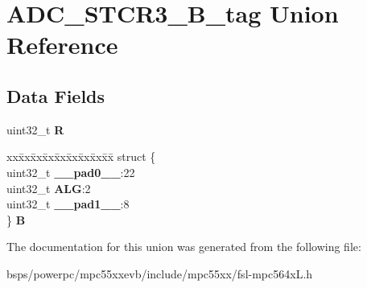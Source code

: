 \hypertarget{unionADC__STCR3__32B__tag}{}\section{A\+D\+C\+\_\+\+S\+T\+C\+R3\+\_\+B\+\_\+tag Union Reference}
\label{unionADC__STCR3__32B__tag}
\subsection*{Data Fields}
\begin{DoxyCompactItemize}
\item 
\mbox{\label{unionADC__STCR3__32B__tag_acdf3058e8b2bf1f8a8a76f86f1c16284}} 
uint32\+\_\+t {\bfseries R}
\item 
\mbox{\label{unionADC__STCR3__32B__tag_af072b17a40a597c13fc4c628c3125b8e}} 
\begin{tabbing}
xx\=xx\=xx\=xx\=xx\=xx\=xx\=xx\=xx\=\kill
struct \{\\
\>uint32\_t {\bfseries \_\_pad0\_\_}:22\\
\>uint32\_t {\bfseries ALG}:2\\
\>uint32\_t {\bfseries \_\_pad1\_\_}:8\\
\} {\bfseries B}\\

\end{tabbing}\end{DoxyCompactItemize}


The documentation for this union was generated from the following file\+:\begin{DoxyCompactItemize}
\item 
bsps/powerpc/mpc55xxevb/include/mpc55xx/fsl-\/mpc564x\+L.\+h\end{DoxyCompactItemize}
